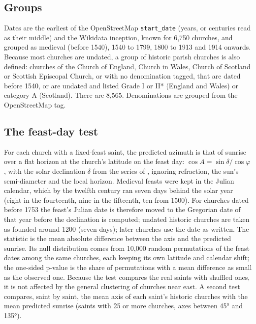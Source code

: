 \documentclass[11pt,a4paper]{article}
\begin{document}
\subsection{Groups}
Dates are the earliest of the OpenStreetMap \texttt{start\_date} (years, or centuries read as their middle) and the Wikidata inception, known for 6,750 churches, and grouped as medieval (before 1540), 1540 to 1799, 1800 to 1913 and 1914 onwards. Because most churches are undated, a group of historic parish churches is also defined: churches of the Church of England, Church in Wales, Church of Scotland or Scottish Episcopal Church, or with no denomination tagged, that are dated before 1540, or are undated and listed Grade I or II* (England and Wales) or category A (Scotland). There are 8,565. Denominations are grouped from the OpenStreetMap tag.

\subsection{The feast-day test}
For each church with a fixed-feast saint, the predicted azimuth is that of sunrise over a flat horizon at the church's latitude on the feast day: $\cos A = \sin\delta / \cos\varphi$, with the solar declination $\delta$ from the series of \citet{spencer}, ignoring refraction, the sun's semi-diameter and the local horizon. Medieval feasts were kept in the Julian calendar, which by the twelfth century ran seven days behind the solar year (eight in the fourteenth, nine in the fifteenth, ten from 1500). For churches dated before 1753 the feast's Julian date is therefore moved to the Gregorian date of that year before the declination is computed; undated historic churches are taken as founded around 1200 (seven days); later churches use the date as written. The statistic is the mean absolute difference between the axis and the predicted sunrise. Its null distribution comes from 10,000 random permutations of the feast dates among the same churches, each keeping its own latitude and calendar shift; the one-sided p-value is the share of permutations with a mean difference as small as the observed one. Because the test compares the real saints with shuffled ones, it is not affected by the general clustering of churches near east. A second test compares, saint by saint, the mean axis of each saint's historic churches with the mean predicted sunrise (saints with 25 or more churches, axes between 45° and 135°).
\end{document}
